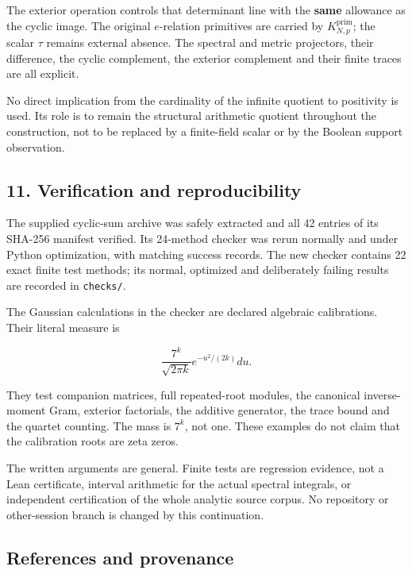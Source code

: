 The exterior operation controls that determinant line with the
\textbf{same} allowance as the cyclic image. The original \(e\)-relation
primitives are carried by \(K_{N,p}^{\mathrm{prim}}\); the scalar
\(\tau\) remains external absence. The spectral and metric projectors,
their difference, the cyclic complement, the exterior complement and
their finite traces are all explicit.

No direct implication from the cardinality of the infinite quotient to
positivity is used. Its role is to remain the structural arithmetic
quotient throughout the construction, not to be replaced by a
finite-field scalar or by the Boolean support observation.

\subsection{11. Verification and
reproducibility}\label{exterior_trace:verification-and-reproducibility}

The supplied cyclic-sum archive was safely extracted and all 42 entries
of its SHA-256 manifest verified. Its 24-method checker was rerun
normally and under Python optimization, with matching success records.
The new checker contains 22 exact finite test methods; its normal,
optimized and deliberately failing results are recorded in
\nolinkurl{checks/}.

The Gaussian calculations in the checker are declared algebraic
calibrations. Their literal measure is

\[
\frac{7^k}{\sqrt{2\pi k}}e^{-u^2/(2k)}du.
\]

They test companion matrices, full repeated-root modules, the canonical
inverse-moment Gram, exterior factorials, the additive generator, the
trace bound and the quartet counting. The mass is \(7^k\), not one.
These examples do not claim that the calibration roots are zeta zeros.

The written arguments are general. Finite tests are regression evidence,
not a Lean certificate, interval arithmetic for the actual spectral
integrals, or independent certification of the whole analytic source
corpus. No repository or other-session branch is changed by this
continuation.

\subsection{References and provenance}\label{exterior_trace:references-and-provenance}

